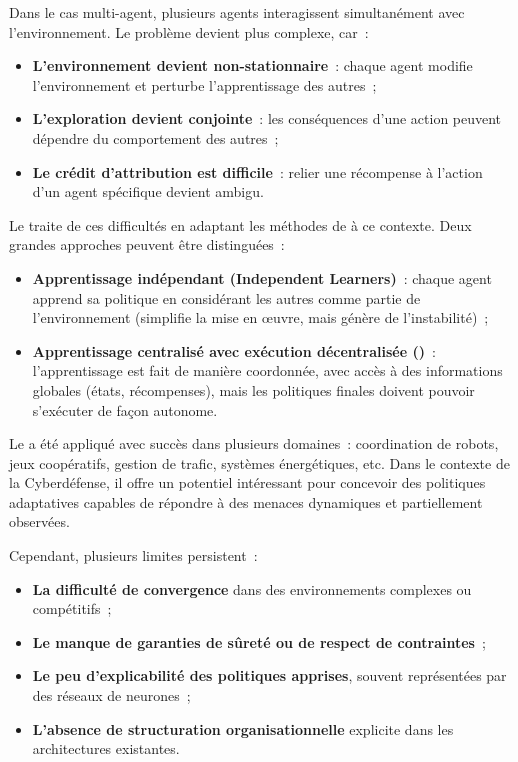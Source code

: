 Dans le cas multi-agent, plusieurs agents interagissent simultanément avec l'environnement. Le problème devient plus complexe, car~:
\begin{itemize}
  \item \textbf{L'environnement devient non-stationnaire}~: chaque agent modifie l'environnement et perturbe l'apprentissage des autres~;
  \item \textbf{L'exploration devient conjointe}~: les conséquences d'une action peuvent dépendre du comportement des autres~;
  \item \textbf{Le crédit d'attribution est difficile}~: relier une récompense à l'action d'un agent spécifique devient ambigu.
\end{itemize}

Le  traite de ces difficultés en adaptant les méthodes de  à ce contexte. Deux grandes approches peuvent être distinguées~:
\begin{itemize}
  \item \textbf{Apprentissage indépendant (Independent Learners)}~: chaque agent apprend sa politique en considérant les autres comme partie de l'environnement (simplifie la mise en œuvre, mais génère de l'instabilité)~;
  \item \textbf{Apprentissage centralisé avec exécution décentralisée ()}~: l'apprentissage est fait de manière coordonnée, avec accès à des informations globales (états, récompenses), mais les politiques finales doivent pouvoir s'exécuter de façon autonome.
\end{itemize}


Le  a été appliqué avec succès dans plusieurs domaines~: coordination de robots, jeux coopératifs, gestion de trafic, systèmes énergétiques, etc. Dans le contexte de la Cyberdéfense, il offre un potentiel intéressant pour concevoir des politiques adaptatives capables de répondre à des menaces dynamiques et partiellement observées.

Cependant, plusieurs limites persistent~:
\begin{itemize}
  \item \textbf{La difficulté de convergence} dans des environnements complexes ou compétitifs~;
  \item \textbf{Le manque de garanties de sûreté ou de respect de contraintes}~;
  \item \textbf{Le peu d'explicabilité des politiques apprises}, souvent représentées par des réseaux de neurones~;
  \item \textbf{L'absence de structuration organisationnelle} explicite dans les architectures existantes.
\end{itemize}

